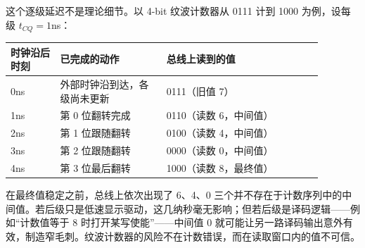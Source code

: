 这个逐级延迟不是理论细节。以 4-bit 纹波计数器从 0111 计到 1000 为例，设每级 $t_{CQ}=1$ns：

\begin{longtable}{L{0.14\linewidth}L{0.30\linewidth}L{0.44\linewidth}}
\toprule
时钟沿后时刻 & 已完成的动作 & 总线上读到的值 \\
\midrule
0ns & 外部时钟沿到达，各级尚未更新 & 0111（旧值 7） \\
1ns & 第 0 位翻转完成 & 0110（读数 6，中间值） \\
2ns & 第 1 位跟随翻转 & 0100（读数 4，中间值） \\
3ns & 第 2 位跟随翻转 & 0000（读数 0，中间值） \\
4ns & 第 3 位最后翻转 & 1000（读数 8，最终值） \\
\bottomrule
\end{longtable}

在最终值稳定之前，总线上依次出现了 6、4、0 三个并不存在于计数序列中的中间值。若后级只是低速显示驱动，这几纳秒毫无影响；但若后级是译码逻辑——例如“计数值等于 8 时打开某写使能”——中间值 0 就可能让另一路译码输出意外有效，制造窄毛刺。纹波计数器的风险不在计数错误，而在读取窗口内的值不可信。

